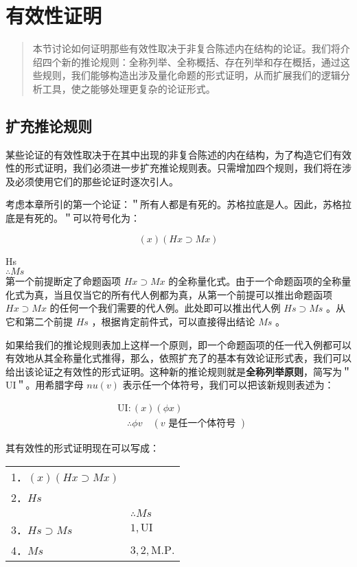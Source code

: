 \section{有效性证明}

\begin{quotation}
本节讨论如何证明那些有效性取决于非复合陈述内在结构的论证。我们将介绍四个新的推论规则：全称列举、全称概括、存在列举和存在概括，通过这些规则，我们能够构造出涉及量化命题的形式证明，从而扩展我们的逻辑分析工具，使之能够处理更复杂的论证形式。
\end{quotation}

\subsection{扩充推论规则}

某些论证的有效性取决于在其中出现的非复合陈述的内在结构，为了构造它们有效性的形式证明，我们必须进一步扩充推论规则表。只需增加四个规则，我们将在涉及必须使用它们的那些论证时逐次引人。

考虑本章所引的第一个论证：＂所有人都是有死的。苏格拉底是人。因此，苏格拉底是有死的。＂可以符号化为：

$$
(x)(H x \supset M x)
$$

Hs\\
$\therefore M s$\\
第一个前提断定了命题函项 $H x \supset M x$ 的全称量化式。由于一个命题函项的全称量化式为真，当且仅当它的所有代人例都为真，从第一个前提可以推出命题函项 $H x \supset M x$ 的任何一个我们需要的代人例。此处即可以推出代人例 $H s \supset M s$ 。从它和第二个前提 $H s$ ，根据肯定前件式，可以直接得出结论 $M s$ 。

如果给我们的推论规则表加上这样一个原则，即一个命题函项的任一代入例都可以有效地从其全称量化式推得，那么，依照扩充了的基本有效论证形式表，我们可以给出该论证之有效性的形式证明。这种新的推论规则就是\textbf{全称列举原则}，简写为＂UI＂。用希腊字母 $n u(v)$ 表示任一个体符号，我们可以把该新规则表述为：

$$
\begin{aligned}
& \mathrm{UI}:(x)(\phi x) \\
& \quad \therefore \phi v \quad(v \text { 是任一个体符号 })
\end{aligned}
$$

其有效性的形式证明现在可以写成：

\begin{center}
\begin{tabular}{ll}
1．$(x)(H x \supset M x)$ &  \\
2．$H s$ &  \\
 & $\therefore M s$ \\
3．$H s \supset M s$ & $1, \mathrm{UI}$ \\
4．$M s$ & $3,2, \mathrm{M} . \mathrm{P}$. \\
\end{tabular}
\end{center}

